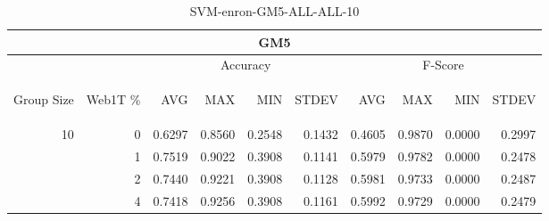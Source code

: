 \begin{center}
\begin{table}[htbp] 
 \begin{center}
\begin{tabular}{ | r | r | r | r | r | r | r | r | r | r |}
\hline
\multicolumn{10}{|c|}{GM5}\\
\hline
 & & \multicolumn{4}{|c|}{Accuracy} & \multicolumn{4}{|c|}{F-Score}\\ \cline{3-10}
\begin{sideways}Group Size\end{sideways} & \begin{sideways}Web1T \%\end{sideways} & \begin{sideways}AVG\end{sideways} & \begin{sideways}MAX\end{sideways} & \begin{sideways}MIN\end{sideways} & \begin{sideways}STDEV\end{sideways} & \begin{sideways}AVG\end{sideways} & \begin{sideways}MAX\end{sideways} & \begin{sideways}MIN\end{sideways} & \begin{sideways}STDEV\end{sideways}\\
\hline
\multirow{3}{*}{10}
 & 0 & 0.6297 & 0.8560 & 0.2548 & 0.1432 & 0.4605 & 0.9870 & 0.0000 & 0.2997\\ \cline{2-10}
 & 1 & 0.7519 & 0.9022 & 0.3908 & 0.1141 & 0.5979 & 0.9782 & 0.0000 & 0.2478\\ \cline{2-10}
 & 2 & 0.7440 & 0.9221 & 0.3908 & 0.1128 & 0.5981 & 0.9733 & 0.0000 & 0.2487\\ \cline{2-10}
 & 4 & 0.7418 & 0.9256 & 0.3908 & 0.1161 & 0.5992 & 0.9729 & 0.0000 & 0.2479\\ \cline{2-10}
\hline
\end{tabular}
\caption{SVM-enron-GM5-ALL-ALL-10}
\label{table:SVM-enron-GM5-ALL-ALL-10}
\end{center}
 \end{table}
\end{center}

